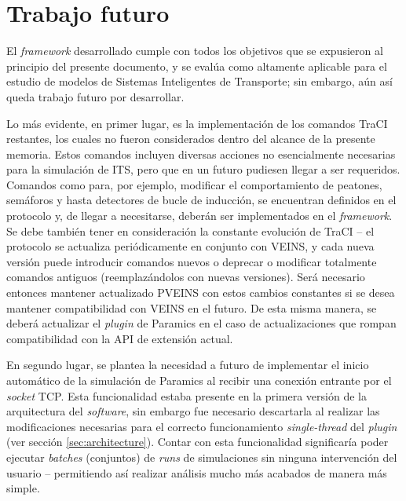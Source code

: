 \section{Trabajo futuro}

El \emph{framework} desarrollado cumple con todos los objetivos que se expusieron al principio del presente documento, y se evalúa como altamente aplicable para el estudio de modelos de Sistemas Inteligentes de Transporte; sin embargo, aún así queda trabajo futuro por desarrollar. 

Lo más evidente, en primer lugar, es la implementación de los comandos TraCI restantes, los cuales no fueron considerados dentro del alcance de la presente memoria. Estos comandos incluyen diversas acciones no esencialmente necesarias para la simulación de ITS, pero que en un futuro pudiesen llegar a ser requeridos. Comandos como para, por ejemplo, modificar el comportamiento de peatones, semáforos y hasta detectores de bucle de inducción, se encuentran definidos en el protocolo y, de llegar a necesitarse, deberán ser implementados en el \emph{framework}. 
Se debe también tener en consideración la constante evolución de TraCI -- el protocolo se actualiza periódicamente en conjunto con VEINS, y cada nueva versión puede introducir comandos nuevos o deprecar o modificar totalmente comandos antiguos (reemplazándolos con nuevas versiones). Será necesario entonces mantener actualizado PVEINS con estos cambios constantes si se desea mantener compatibilidad con VEINS en el futuro. 
De esta misma manera, se deberá actualizar el \emph{plugin} de Paramics en el caso de actualizaciones que rompan compatibilidad con la API de extensión actual.

En segundo lugar, se plantea la necesidad a futuro de implementar el inicio automático de la simulación de Paramics al recibir una conexión entrante por el \emph{socket} TCP. Esta funcionalidad estaba presente en la primera versión de la arquitectura del \emph{software}, sin embargo fue necesario descartarla al realizar las modificaciones necesarias para el correcto funcionamiento \emph{single-thread} del \emph{plugin} (ver sección \ref{sec:architecture}). Contar con esta funcionalidad significaría poder ejecutar \emph{batches} (conjuntos) de \emph{runs} de simulaciones sin ninguna intervención del usuario -- permitiendo así realizar análisis mucho más acabados de manera más simple.


